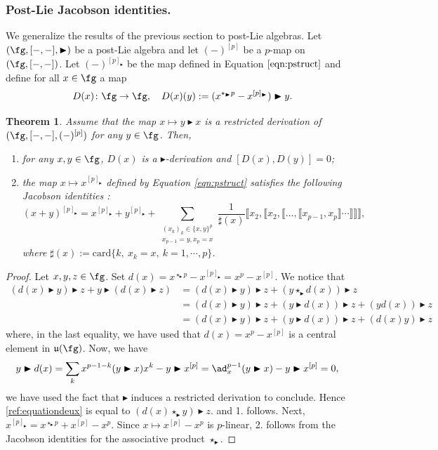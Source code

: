 \documentclass[12pt]{article}
\newcommand{\btr}{\blacktriangleright}
\newtheorem{theorem}{Theorem}[subsection]
\begin{document}
\subsubsection{Post-Lie Jacobson identities.}
\label{sec:postliejacobson}
We generalize the results of the previous section to post-Lie algebras. Let $(\fg,[-,-],\btr)$ be a post-Lie algebra and let $(-)^{[p]}$ be a $p$-map on $(\fg,[-,-])$. Let $(-)^{[p]_{\btr}}$ be the map defined in Equation $\eqref{eqn:pstruct}$ and define for all $x\in \fg$ a map
$$
D(x)\colon \fg\to\fg,\quad D(x)(y): = (x^{\star_{\btr}p}-x^{[p]_{\btr}})\btr y.
$$
\begin{theorem}
\label{prop:jacobsonidentitties}
Assume that the map $x\mapsto y \btr x$ is a restricted derivation of $(\fg, [-,-], (-)^{[p]})$ for any $y\in \fg$. Then, 
\begin{enumerate}
\item for any $x,y\in \fg$, $D(x)$ is a $\btr$-derivation and $[D(x), D(y)] = 0$; 
\item the map $x\mapsto x^{[p]_{\btr}}$ defined by Equation \eqref{eqn:pstruct} satisfies the following Jacobson identities :
\begin{equation}
(x+y)^{[p]_{\btr}} = x^{[p]_{\btr}} + y^{[p]_{\btr}} + \sum_{\substack{(x_k)_k \in \{x,y\}^{p}\\ x_{p-1}=y, x_p =x}} \frac{1}{\sharp(x)} \llbracket x_2,\llbracket x_2, \llbracket \ldots,\llbracket x_{p-1},x_p \rrbracket \cdots \rrbracket\rrbracket \rrbracket,
\end{equation}
where $\sharp(x):=\text{card}\{k,~x_k=x,~k=1,\cdots,p\}$.
\end{enumerate}
\end{theorem}
\begin{proof}
Let $x,y,z \in \fg$. Set $d(x) = x^{\star_{\btr}p}-x^{[p]_{\btr}}= x^{p}-x^{[p]}$. We notice that 
\begin{align}
(d(x) \btr y)\btr z +y \btr  (d(x) \btr z) &= (d(x) \btr y)\btr z + (y \star_{\btr} d(x))\btr z \nonumber \\
&=(d(x) \btr y)\btr z + (y \btr d(x))\btr z + (yd(x))\btr z \nonumber \\
&=(d(x) \btr y)\btr z + (y \btr d(x))\btr z + (d(x)y)\btr z \label{ref:equationdeux}
\end{align}
where, in the last equality, we have used that $ d(x) = x^p-x^{[p]}$ is a central element in $\mathfrak{u}(\fg)$.
Now, we have
\begin{align*}
y \btr d(x) &=  \sum_k x^{p-1-k}(y \btr x) x^k - y \btr x^{[p]} = \ad_x^{p-1}(y \btr x) - y \btr x^{[p]} =0,
\end{align*}
we have used the fact that $\btr$ induces a restricted derivation to conclude. Hence \eqref{ref:equationdeux} is equal to 
$
( d(x) \star_{\btr} y) \btr z.
$
and 1. follows. Next, $x^{[p]_{\btr}} = x^{\star_{\btr}p} + x^{[p]}-x^{p}$. Since $x\mapsto x^{[p]}-x^{p}$ is $p$-linear, 2. follows from the Jacobson identities for the associative product $\star_{\btr}$. 
\end{proof}
\end{document}
